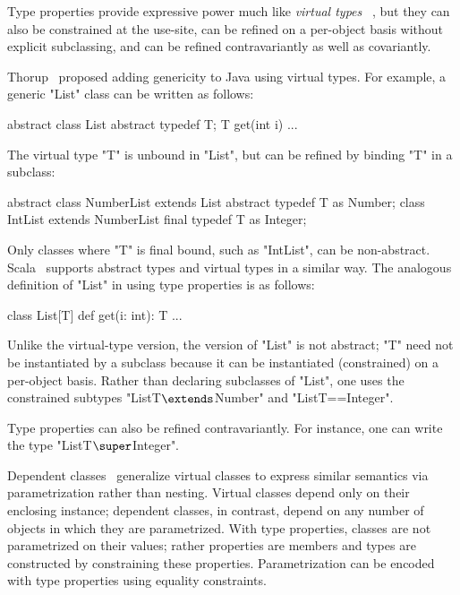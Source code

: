 Type properties provide expressive power much like 
\emph{virtual types}~\cite{beta,mp89-virtual-classes,ernst06-virtual}
, but they can also
be constrained at the use-site,
can be refined on a per-object basis without explicit subclassing,
and can be refined contravariantly as well as covariantly.

Thorup~\cite{thorup97}
proposed adding genericity to Java using virtual types.  For example,
a generic \xcd"List" class can be written as follows:
{
\begin{xten}
abstract class List {
  abstract typedef T;
  T get(int i) { ... }
}
\end{xten}}
\noindent
The virtual type \xcd"T" is unbound in \xcd"List", but 
can be refined by binding \xcd"T" in a subclass:
{
\begin{xten}
abstract class NumberList extends List {
  abstract typedef T as Number;
}
class IntList extends NumberList {
  final typedef T as Integer;
}
\end{xten}}
\noindent
Only classes where \xcd"T" is final bound, such as \xcd"IntList",
can be non-abstract.  Scala~\cite{scala} supports abstract types
and virtual types in a similar way.
%
The analogous definition of 
\xcd"List" in \Xten{} using type properties is as follows:
{
\begin{xten}
class List[T] {
  def get(i: int): T { ... }
}
\end{xten}}

\noindent
Unlike the virtual-type version,
the \Xten{} version of \xcd"List" is not abstract;
\xcd"T" need not be instantiated by a subclass because it can be
instantiated (constrained) on a per-object basis.
Rather than declaring subclasses of \xcd"List",
one uses the constrained subtypes
\xcdmath"List{T$\extends$Number}" and \xcd"List{T==Integer}".

Type properties can also be refined contravariantly.
For instance, one can write the type \xcdmath"List{T$\super$Integer}".

Dependent classes~\cite{dependent-classes} generalize virtual
classes to express similar semantics via parametrization rather
than nesting.  Virtual classes depend only on their enclosing
instance; dependent classes, in contrast, depend on any number
of objects in which they are parametrized.  With type
properties, classes are not parametrized on their values;
rather properties are members and types are constructed by
constraining these properties.  Parametrization can be 
encoded with type properties using equality constraints.

